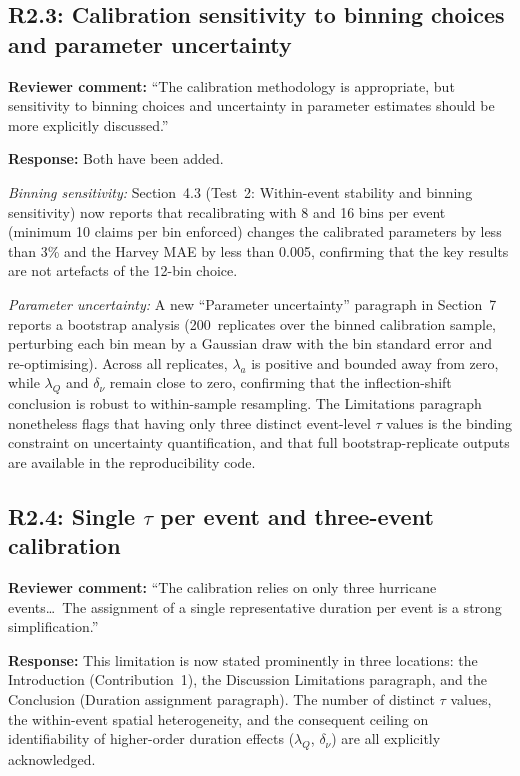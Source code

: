 \documentclass[11pt]{article}
\begin{document}
\subsection*{R2.3: Calibration sensitivity to binning choices and parameter uncertainty}

\textbf{Reviewer comment:} ``The calibration methodology is appropriate, but sensitivity to binning choices and uncertainty in parameter estimates should be more explicitly discussed.''

\textbf{Response:} Both have been added.

\textit{Binning sensitivity:} Section~4.3 (Test~2: Within-event stability and binning sensitivity) now reports that recalibrating with 8 and 16 bins per event (minimum 10 claims per bin enforced) changes the calibrated parameters by less than 3\% and the Harvey MAE by less than 0.005, confirming that the key results are not artefacts of the 12-bin choice.

\textit{Parameter uncertainty:} A new ``Parameter uncertainty'' paragraph in Section~7 reports a bootstrap analysis (200~replicates over the binned calibration sample, perturbing each bin mean by a Gaussian draw with the bin standard error and re-optimising). Across all replicates, $\lambda_a$ is positive and bounded away from zero, while $\lambda_Q$ and $\delta_\nu$ remain close to zero, confirming that the inflection-shift conclusion is robust to within-sample resampling. The Limitations paragraph nonetheless flags that having only three distinct event-level $\tau$ values is the binding constraint on uncertainty quantification, and that full bootstrap-replicate outputs are available in the reproducibility code.

\subsection*{R2.4: Single $\tau$ per event and three-event calibration}

\textbf{Reviewer comment:} ``The calibration relies on only three hurricane events\ldots\ The assignment of a single representative duration per event is a strong simplification.''

\textbf{Response:} This limitation is now stated prominently in three locations: the Introduction (Contribution~1), the Discussion Limitations paragraph, and the Conclusion (Duration assignment paragraph). The number of distinct $\tau$ values, the within-event spatial heterogeneity, and the consequent ceiling on identifiability of higher-order duration effects ($\lambda_Q$, $\delta_\nu$) are all explicitly acknowledged.
\end{document}
